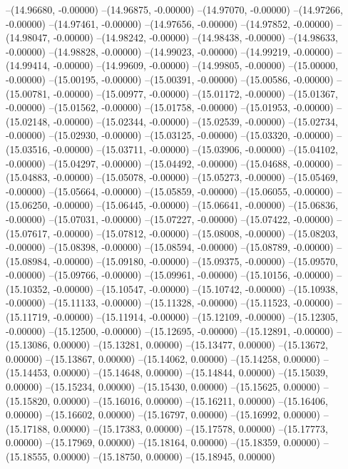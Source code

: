 --(14.96680, -0.00000)
--(14.96875, -0.00000)
--(14.97070, -0.00000)
--(14.97266, -0.00000)
--(14.97461, -0.00000)
--(14.97656, -0.00000)
--(14.97852, -0.00000)
--(14.98047, -0.00000)
--(14.98242, -0.00000)
--(14.98438, -0.00000)
--(14.98633, -0.00000)
--(14.98828, -0.00000)
--(14.99023, -0.00000)
--(14.99219, -0.00000)
--(14.99414, -0.00000)
--(14.99609, -0.00000)
--(14.99805, -0.00000)
--(15.00000, -0.00000)
--(15.00195, -0.00000)
--(15.00391, -0.00000)
--(15.00586, -0.00000)
--(15.00781, -0.00000)
--(15.00977, -0.00000)
--(15.01172, -0.00000)
--(15.01367, -0.00000)
--(15.01562, -0.00000)
--(15.01758, -0.00000)
--(15.01953, -0.00000)
--(15.02148, -0.00000)
--(15.02344, -0.00000)
--(15.02539, -0.00000)
--(15.02734, -0.00000)
--(15.02930, -0.00000)
--(15.03125, -0.00000)
--(15.03320, -0.00000)
--(15.03516, -0.00000)
--(15.03711, -0.00000)
--(15.03906, -0.00000)
--(15.04102, -0.00000)
--(15.04297, -0.00000)
--(15.04492, -0.00000)
--(15.04688, -0.00000)
--(15.04883, -0.00000)
--(15.05078, -0.00000)
--(15.05273, -0.00000)
--(15.05469, -0.00000)
--(15.05664, -0.00000)
--(15.05859, -0.00000)
--(15.06055, -0.00000)
--(15.06250, -0.00000)
--(15.06445, -0.00000)
--(15.06641, -0.00000)
--(15.06836, -0.00000)
--(15.07031, -0.00000)
--(15.07227, -0.00000)
--(15.07422, -0.00000)
--(15.07617, -0.00000)
--(15.07812, -0.00000)
--(15.08008, -0.00000)
--(15.08203, -0.00000)
--(15.08398, -0.00000)
--(15.08594, -0.00000)
--(15.08789, -0.00000)
--(15.08984, -0.00000)
--(15.09180, -0.00000)
--(15.09375, -0.00000)
--(15.09570, -0.00000)
--(15.09766, -0.00000)
--(15.09961, -0.00000)
--(15.10156, -0.00000)
--(15.10352, -0.00000)
--(15.10547, -0.00000)
--(15.10742, -0.00000)
--(15.10938, -0.00000)
--(15.11133, -0.00000)
--(15.11328, -0.00000)
--(15.11523, -0.00000)
--(15.11719, -0.00000)
--(15.11914, -0.00000)
--(15.12109, -0.00000)
--(15.12305, -0.00000)
--(15.12500, -0.00000)
--(15.12695, -0.00000)
--(15.12891, -0.00000)
--(15.13086, 0.00000)
--(15.13281, 0.00000)
--(15.13477, 0.00000)
--(15.13672, 0.00000)
--(15.13867, 0.00000)
--(15.14062, 0.00000)
--(15.14258, 0.00000)
--(15.14453, 0.00000)
--(15.14648, 0.00000)
--(15.14844, 0.00000)
--(15.15039, 0.00000)
--(15.15234, 0.00000)
--(15.15430, 0.00000)
--(15.15625, 0.00000)
--(15.15820, 0.00000)
--(15.16016, 0.00000)
--(15.16211, 0.00000)
--(15.16406, 0.00000)
--(15.16602, 0.00000)
--(15.16797, 0.00000)
--(15.16992, 0.00000)
--(15.17188, 0.00000)
--(15.17383, 0.00000)
--(15.17578, 0.00000)
--(15.17773, 0.00000)
--(15.17969, 0.00000)
--(15.18164, 0.00000)
--(15.18359, 0.00000)
--(15.18555, 0.00000)
--(15.18750, 0.00000)
--(15.18945, 0.00000)
